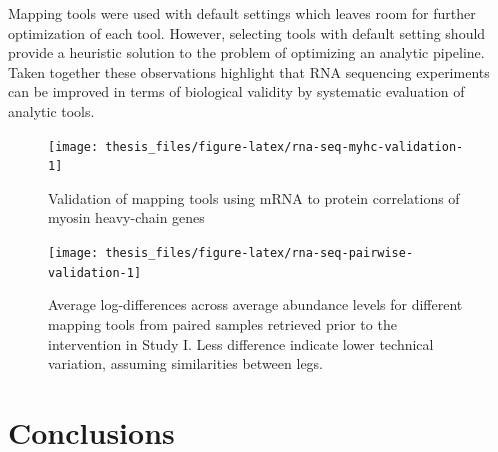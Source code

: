 \documentclass[twoside,10pt]{gihclass} %
\begin{document}
Mapping tools were used with default settings which leaves room for further optimization of each tool. However, selecting tools with default setting should provide a heuristic solution to the problem of optimizing an analytic pipeline. Taken together these observations highlight that RNA sequencing experiments can be improved in terms of biological validity by systematic evaluation of analytic tools.
\begin{figure}

{\centering \texttt{[image: thesis\_files/figure-latex/rna-seq-myhc-validation-1]} 

}

\caption[Correlations between gene-family normalized protein and gene data from different mRNA quantification methods.]{Validation of mapping tools using mRNA to protein correlations of myosin heavy-chain genes}\label{fig:rna-seq-myhc-validation}
\end{figure}
\begin{figure}

{\centering \texttt{[image: thesis\_files/figure-latex/rna-seq-pairwise-validation-1]} 

}

\caption[Within-participant variation between RNA sequencing mapping tools.]{Average log-differences across average abundance levels for different mapping tools from paired samples retrieved prior to the intervention in Study I. Less difference indicate lower technical variation, assuming similarities between legs.}\label{fig:rna-seq-pairwise-validation}
\end{figure}
\hypertarget{conclusions}{%
\chapter{Conclusions}\label{conclusions}}
\end{document}
